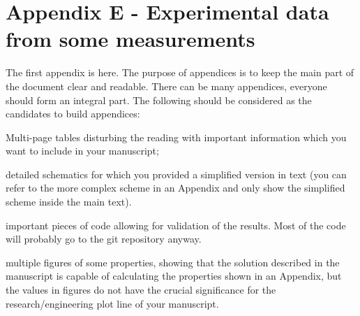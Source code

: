 \cleardoublepage%
\chapter*{\label{chap:apx_e}Appendix E - Experimental data\\from some measurements}%
%

  
The first appendix is here. The purpose of appendices is to keep the main part of the document clear and readable. There can be many appendices, everyone should form an integral part. The following should be considered as the candidates to build appendices:

\begin{tight_itemize}
    \item Multi-page tables disturbing the reading with important information which you want to include in your manuscript;
    \item detailed schematics for which you provided a simplified version in text (you can refer to the more complex scheme in an Appendix and only show the simplified scheme inside the main text).
    \item important pieces of code allowing for validation of the results. Most of the code will probably go to the git repository anyway.
    \item multiple figures of some properties, showing that the solution described in the manuscript is capable of calculating the properties shown in an Appendix, but the values in figures do not have the crucial significance for the research/engineering plot line of your manuscript.
\end{tight_itemize}